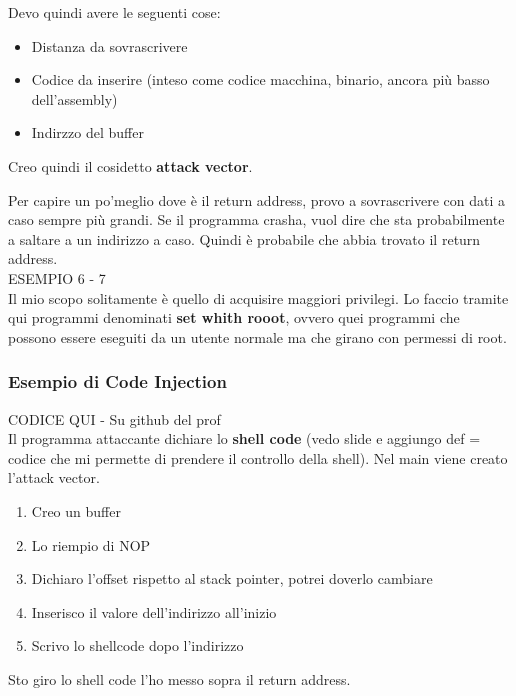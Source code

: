 \documentclass[a4paper,12pt]{article}
\begin{document}
Devo quindi avere le seguenti cose:
\begin{itemize}
\item Distanza da sovrascrivere
\item Codice da inserire (inteso come codice macchina, binario, ancora più basso dell'assembly)
\item Indirzzo del buffer
\end{itemize}

Creo quindi il cosidetto \textbf{attack vector}.


Per capire un po'meglio dove è il return address, provo a sovrascrivere con dati a caso sempre più grandi. Se il programma crasha, vuol dire che sta probabilmente a saltare a un indirizzo a caso. Quindi è probabile che abbia trovato il return address.
\\ESEMPIO 6 - 7\\
Il mio scopo solitamente è quello di acquisire maggiori privilegi. Lo faccio tramite qui programmi denominati \textbf{set whith rooot}, ovvero quei programmi che possono essere eseguiti da un utente normale ma che girano con permessi di root.

\subsubsection{Esempio di Code Injection}
CODICE QUI - Su github del prof\\
Il programma attaccante dichiare lo \textbf{shell code} (vedo slide e aggiungo def = codice che mi permette di prendere il controllo della shell). Nel main viene creato l'attack vector.
\begin{enumerate}
\item Creo un buffer
\item Lo riempio di NOP
\item Dichiaro l'offset rispetto al stack pointer, potrei doverlo cambiare
\item Inserisco il valore dell'indirizzo all'inizio
\item Scrivo lo shellcode dopo l'indirizzo
\end{enumerate}

Sto giro lo shell code l'ho messo sopra il return address.
\end{document}
